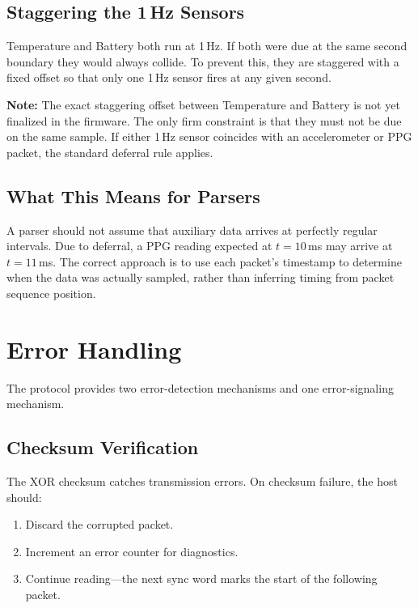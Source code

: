 \documentclass[11pt,a4paper]{article}
\newcommand{\notebox}[1]{\par\medskip\noindent\colorbox{backgray}{\parbox{\dimexpr\linewidth-2\fboxsep}{\textbf{Note:} #1}}\medskip}
\begin{document}
\subsection{Staggering the 1\,Hz Sensors}

Temperature and Battery both run at 1\,Hz.  If both were due at the same second boundary they would always collide.  To prevent this, they are staggered with a fixed offset so that only one 1\,Hz sensor fires at any given second.

\notebox{The exact staggering offset between Temperature and Battery is not yet finalized in the firmware.  The only firm constraint is that they must not be due on the same sample.  If either 1\,Hz sensor coincides with an accelerometer or PPG packet, the standard deferral rule applies.}

\subsection{What This Means for Parsers}

A parser should not assume that auxiliary data arrives at perfectly regular intervals.  Due to deferral, a PPG reading expected at $t = 10$\,ms may arrive at $t = 11$\,ms.  The correct approach is to use each packet's timestamp to determine when the data was actually sampled, rather than inferring timing from packet sequence position.

\section{Error Handling}
\label{sec:error}

The protocol provides two error-detection mechanisms and one error-signaling mechanism.

\subsection{Checksum Verification}

The XOR checksum catches transmission errors.  On checksum failure, the host should:

\begin{enumerate}
    \item Discard the corrupted packet.
    \item Increment an error counter for diagnostics.
    \item Continue reading---the next sync word marks the start of the following packet.
\end{enumerate}
\end{document}
